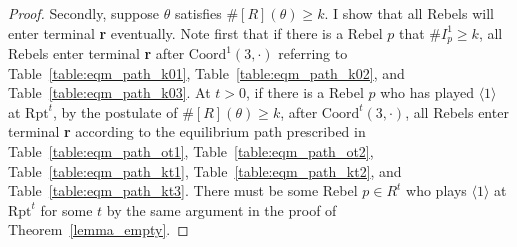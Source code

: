 \documentclass[12pt,letter]{article}
\newcommand{\Kappa}{\mathrm{Coord}}
\newcommand{\Omicron}{\mathrm{Rpt}}
\theoremstyle{definition}
\theoremstyle{remark}
\theoremstyle{claim}
\begin{document}
\begin{proof}
Secondly, suppose $\theta$ satisfies $\#[R](\theta)\geq k$. I show that all Rebels will enter terminal \textbf{r} eventually. Note first that if there is a Rebel $p$ that $\#I^1_p\geq k$, all Rebels enter terminal \textbf{r} after $\Kappa^1(3,\cdot)$ referring to Table~\ref{table:eqm_path_k01}, Table~\ref{table:eqm_path_k02}, and Table~\ref{table:eqm_path_k03}. At $t>0$, if there is a Rebel $p$ who has played $\langle 1 \rangle$ at $\Omicron^t$, by the postulate of $\#[R](\theta)\geq k$, after $\Kappa^t(3,\cdot)$, all Rebels enter terminal \textbf{r} according to the equilibrium path prescribed in Table~\ref{table:eqm_path_ot1}, Table~\ref{table:eqm_path_ot2}, Table~\ref{table:eqm_path_kt1}, Table~\ref{table:eqm_path_kt2}, and Table~\ref{table:eqm_path_kt3}. There must be some Rebel $p\in R^t$ who plays $\langle 1 \rangle$ at $\Omicron^t$ for some $t$ by the same argument in the proof of Theorem~\ref{lemma_empty}.
\end{proof}
\end{document}
